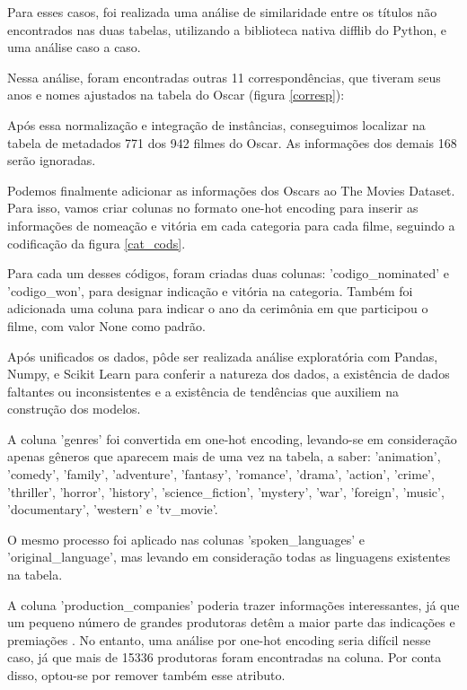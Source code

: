         Para esses casos, foi realizada uma análise de similaridade entre os títulos não encontrados nas duas tabelas, utilizando a biblioteca nativa difflib do Python, e uma análise caso a caso.

        Nessa análise, foram encontradas outras 11 correspondências, que tiveram seus anos e nomes ajustados na tabela do Oscar (figura \ref{corresp}):\newline

        Após essa normalização e integração de instâncias, conseguimos localizar na tabela de metadados 771 dos 942 filmes do Oscar. As informações dos demais 168 serão ignoradas.

        Podemos finalmente adicionar as informações dos Oscars ao The Movies Dataset. Para isso, vamos criar colunas no formato one-hot encoding para inserir as informações de nomeação e vitória em cada categoria para cada filme, seguindo a codificação da figura \ref{cat_cods}.

        Para cada um desses códigos, foram criadas duas colunas: '{codigo}\_nominated' e '{codigo}\_won', para designar indicação e vitória na categoria. Também foi adicionada uma coluna para indicar o ano da cerimônia em que participou o filme, com valor None como padrão.\newline

        Após unificados os dados, pôde ser realizada análise exploratória com Pandas, Numpy, e Scikit Learn para conferir a natureza dos dados, a existência de dados faltantes ou inconsistentes e a existência de tendências que auxiliem na construção dos modelos.\newline

        A coluna 'genres' foi convertida em one-hot encoding, levando-se em consideração apenas gêneros que aparecem mais de uma vez na tabela, a saber: 'animation', 'comedy', 'family', 'adventure', 'fantasy', 'romance', 'drama', 'action', 'crime', 'thriller', 'horror', 'history', 'science\_fiction', 'mystery', 'war', 'foreign', 'music', 'documentary', 'western' e 'tv\_movie'.

        O mesmo processo foi aplicado nas colunas 'spoken\_languages' e 'original\_language', mas levando em consideração todas as linguagens existentes na tabela.

        A coluna 'production\_companies' poderia trazer informações interessantes, já que um pequeno número de grandes produtoras detêm a maior parte das indicações e premiações \cite{argon2020}. No entanto, uma análise por one-hot encoding seria difícil nesse caso, já que mais de 15336 produtoras foram encontradas na coluna. Por conta disso, optou-se por remover também esse atributo.

